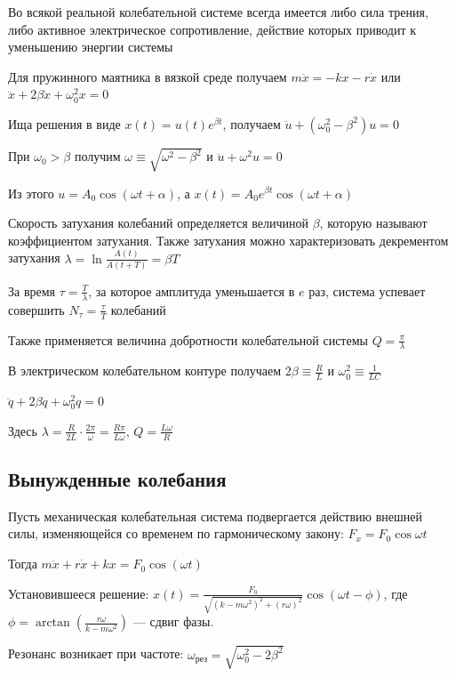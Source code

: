 \documentclass[12pt]{article}
\begin{document}
Во всякой реальной колебательной системе всегда имеется либо сила трения, либо активное электрическое сопротивление,
действие которых приводит к уменьшению энергии системы 

Для пружинного маятника в вязкой среде получаем $m \ddot x = -kx - r\dot x$ или $\ddot x + 2 \beta \dot x + \omega^2_0 x = 0$

Ища решения в виде $x(t) = u(t) e^{\beta t}$, получаем $\ddot u + (\omega^2_0 - \beta^2) u = 0$

При $\omega_0 > \beta$ получим $\omega \equiv \sqrt{\omega^2 - \beta^2}$ и $\ddot u + \omega^2 u = 0$

Из этого $u = A_0 \cos (\omega t + \alpha)$, а $x(t) = A_0 e^{\beta t} \cos (\omega t + \alpha)$

Скорость затухания колебаний определяется величиной $\beta$, которую называют коэффициентом затухания. 
Также затухания можно характеризовать декрементом затухания $\lambda = \ln \frac{A(t)}{A(t + T)} = \beta T$

За время $\tau = \frac{T}{\lambda}$, за которое амплитуда уменьшается в $e$ раз, система успевает совершить $N_\tau = \frac{\tau}{T}$
колебаний

Также применяется величина добротности колебательной системы $Q = \frac{\pi}{\lambda}$

В электрическом колебательном контуре получаем $2\beta \equiv \frac{R}{L}$ и $\omega_0^2 \equiv \frac{1}{LC}$

$\ddot q + 2\beta \dot q + \omega^2_0 q = 0$

Здесь $\lambda = \frac{R}{2L} \cdot \frac{2\pi}{\omega} = \frac{R\pi}{L \omega}$, $Q = \frac{L\omega}{R}$


\subsection{Вынужденные колебания}

Пусть механическая колебательная система подвергается действию
внешней силы, изменяющейся со временем по гармоническому закону: $F_x = F_0 \cos \omega t$

Тогда $m\ddot{x} + r\dot{x} + kx = F_0 \cos(\omega t)$

Установившееся решение: $x(t) = \frac{F_0}{\sqrt{(k - m\omega^2)^2 + (r\omega)^2}} \cos(\omega t - \phi)$,
где $\phi = \arctan\left(\frac{r\omega}{k - m\omega^2}\right)$ — сдвиг фазы. 

Резонанс возникает при частоте: $\omega_{\text{рез}} = \sqrt{\omega_0^2 - 2\beta^2}$
\end{document}
